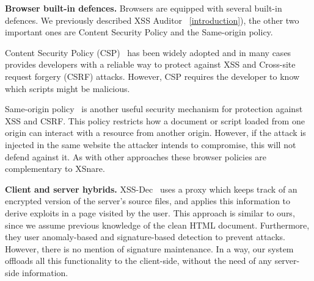 \noindent \textbf{Browser built-in defences.}  Browsers are equipped
with several built-in defences. We previously described XSS
Auditor ~\ref{introduction}), the other two important ones are Content
Security Policy and the Same-origin policy.

Content Security Policy (CSP)~\cite{CSP} has been widely adopted and
in many cases provides developers with a reliable way to protect
against \ac{XSS} and Cross-site request forgery (CSRF)
attacks. However, CSP requires the developer to know which scripts
might be malicious.

Same-origin policy~\cite{SOP} is another useful security mechanism for
protection against \ac{XSS} and CSRF. This policy restricts how a
document or script loaded from one origin can interact with a resource
from another origin. However, if the attack is injected in the same
website the attacker intends to compromise, this will not defend
against it. As with other approaches these browser policies are complementary to XSnare.

\noindent \textbf{Client and server hybrids.}
XSS-Dec~\cite{Sundareswaran:2012:XHS:2352970.2352994} uses a proxy which keeps track of an encrypted version of the server's source files, and applies this information to derive exploits in a page visited by the user. This approach is similar to ours, since we assume previous
knowledge of the clean HTML document. Furthermore, they user anomaly-based and signature-based detection to prevent attacks. However, there is no mention of signature maintenance. In a way, our system offloads all this functionality to the client-side, without the need of any server-side information.


